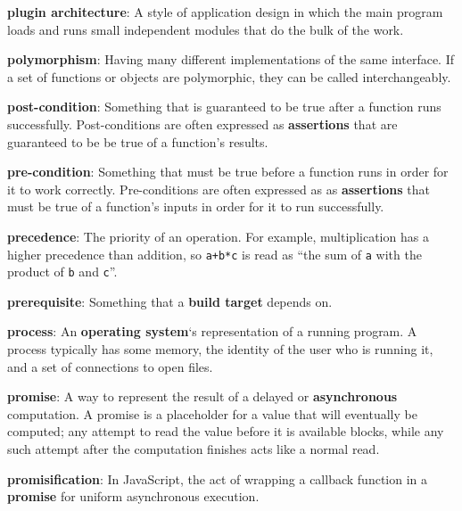 \documentclass[krantzl]{krantz}
\newcommand{\glosskey}[1]{\textbf{#1}}
\begin{document}
\noindent \textbf{{\newline}\glosskey{plugin architecture}}: 
A style of application design in which the main program loads and runs small independent modules that do the bulk of the work.


\noindent \textbf{{\newline}\glosskey{polymorphism}}: 
Having many different implementations of the same interface. If a set of functions or objects are polymorphic, they can be called interchangeably.


\noindent \textbf{{\newline}\glosskey{post-condition}}: 
Something that is guaranteed to be true after a function runs successfully. Post-conditions are often expressed as \glosskey{assertions} that are guaranteed to be be true of a function’s results.


\noindent \textbf{{\newline}\glosskey{pre-condition}}: 
Something that must be true before a function runs in order for it to work correctly. Pre-conditions are often expressed as as \glosskey{assertions} that must be true of a function’s inputs in order for it to run successfully.


\noindent \textbf{{\newline}\glosskey{precedence}}: 
The priority of an operation. For example, multiplication has a higher precedence than addition, so \texttt{a+b*c} is read as “the sum of \texttt{a} with the product of \texttt{b} and \texttt{c}”.


\noindent \textbf{{\newline}\glosskey{prerequisite}}: 
Something that a \glosskey{build target} depends on.


\noindent \textbf{{\newline}\glosskey{process}}: 
An \glosskey{operating system}‘s representation of a running program. A process typically has some memory, the identity of the user who is running it, and a set of connections to open files.


\noindent \textbf{{\newline}\glosskey{promise}}: 
A way to represent the result of a delayed or \glosskey{asynchronous} computation. A promise is a placeholder for a value that will eventually be computed; any attempt to read the value before it is available blocks, while any such attempt after the computation finishes acts like a normal read.


\noindent \textbf{{\newline}\glosskey{promisification}}: 
In JavaScript, the act of wrapping a callback function in a \glosskey{promise} for uniform asynchronous execution.
\end{document}
